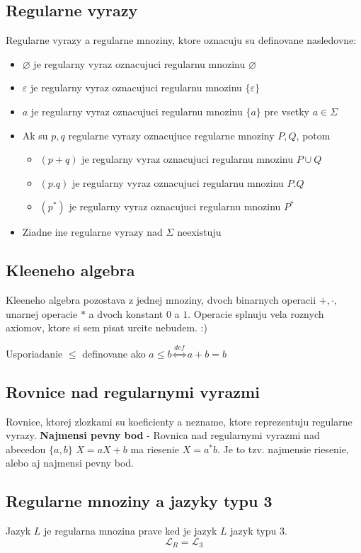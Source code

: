 \documentclass[12pt]{article}
\begin{document}
\subsection*{Regularne vyrazy}
Regularne vyrazy a regularne mnoziny, ktore oznacuju su definovane nasledovne:
\begin{itemize}
	\item $\varnothing$ je regularny vyraz oznacujuci regularnu mnozinu $\varnothing$
	\item $\varepsilon$ je regularny vyraz oznacujuci regularnu mnozinu $\{\varepsilon\}$
	\item $a$ je regularny vyraz oznacujuci regularnu mnozinu $\{a\}$ pre vsetky $a \in \Sigma$
	\item Ak su $p,q$ regularne vyrazy oznacujuce regularne mnoziny $P,Q$, potom
		\begin{itemize}
			\item $(p + q)$ je regularny vyraz oznacujuci regularnu mnozinu $P \cup Q$
			\item $(p.q)$ je regularny vyraz oznacujuci regularnu mnozinu $P.Q$
			\item $(p^{*})$ je regularny vyraz oznacujuci regularnu mnozinu $P^{*}$
		\end{itemize}
	\item Ziadne ine regularne vyrazy nad $\Sigma$ neexistuju
\end{itemize}

\subsection*{Kleeneho algebra}
Kleeneho algebra pozostava z jednej mnoziny, dvoch binarnych operacii $+, \cdot$, unarnej operacie $*$ a
dvoch konstant $0$ a $1$. Operacie splnuju vela roznych axiomov, ktore si sem pisat urcite nebudem. :)

Usporiadanie $\le$ definovane ako $a \le b \overset{def}{\Leftrightarrow} a + b = b$

\subsection*{Rovnice nad regularnymi vyrazmi}
Rovnice, ktorej zlozkami su koeficienty a nezname, ktore reprezentuju regularne vyrazy.
\textbf{Najmensi pevny bod} - Rovnica nad regularnymi vyrazmi nad abecedou $\{a,b\}$ $X = aX + b$ ma riesenie
$X = a^{*}b$. Je to tzv. najmensie riesenie, alebo aj najmensi pevny bod.

\subsection*{Regularne mnoziny a jazyky typu 3}
Jazyk $L$ je regularna mnozina prave ked je jazyk $L$ jazyk typu 3.
\begin{equation*}
	\mathcal{L}_{R} = \mathcal{L}_{3}
\end{equation*}
\end{document}
